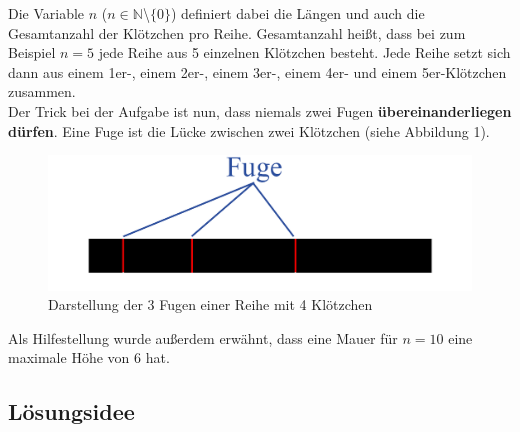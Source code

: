 \documentclass[a4paper,12pt]{article}
\begin{document}
Die Variable $n$ ($n \in \mathbb{N}$\textbackslash$\{0\}$) definiert dabei die Längen und auch die Gesamtanzahl der Klötzchen pro Reihe.
Gesamtanzahl heißt, dass bei zum Beispiel $n = 5$ jede Reihe aus 5 einzelnen Klötzchen besteht. 
Jede Reihe setzt sich dann aus einem 1er-, einem 2er-, einem 3er-, einem 4er- und einem 5er-Klötzchen zusammen.
\\[0.4cm]
Der Trick bei der Aufgabe ist nun, dass niemals zwei Fugen \textbf{übereinanderliegen dürfen}.
Eine Fuge ist die Lücke zwischen zwei Klötzchen (siehe Abbildung 1).
\begin{figure}[H]
    \centering
    \includegraphics[width=0.8\linewidth]{Bilder/Aufgabe1/Definition_Fuge.png}
    \caption{Darstellung der 3 Fugen einer Reihe mit 4 Klötzchen}
\end{figure}

Als Hilfestellung wurde außerdem erwähnt, dass eine Mauer für $n = 10$ eine maximale Höhe von $6$ hat.

\subsection{Lösungsidee}
\end{document}
